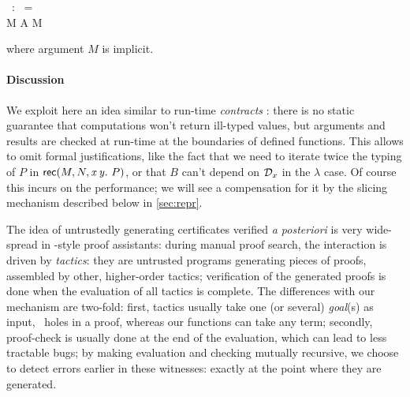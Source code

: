 \documentclass{llncs}
\begin{document}
\begin{mathleft}
  \fget{}\ :\     =
  \\\qquad\quad \lamd M \lamd A \lamd \md M
\end{mathleft}

\noindent
where argument $M$ is implicit.

\paragraph{Discussion}

We exploit here an idea similar to run-time \emph{contracts}
\cite{wadler2009well}: there is no static guarantee that computations
won't return ill-typed values, but arguments and results are checked
at run-time at the boundaries of defined functions. This allows to
omit formal justifications, like the fact that we need to iterate
twice the typing of $P$ in $\text{\textsf{rec}}({M},{N},{\text{\textit{x}}}\,{\text{\textit{y}}}.\ {P})$, or that $B$ can't depend
on $\mathcal D_x$ in the $\lambda$ case. Of course this incurs on the
performance; we will see a compensation for it by the slicing
mechanism described below in \ref{sec:repr}.

The idea of untrustedly generating certificates verified \emph{a
  posteriori} is very wide-spread in -style proof
assistants: during manual proof search, the interaction is driven by
\emph{tactics}: %
they are untrusted programs generating pieces of proofs, assembled by
other, higher-order tactics; verification of the generated proofs is
done when the evaluation of all tactics is complete. The differences
with our mechanism are two-fold: first, tactics usually take one (or
several) \emph{goal}(s) as input, \ie\ holes in a proof, whereas our
functions can take any term; secondly, proof-check is usually done at
the end of the evaluation, which can lead to less tractable bugs; by
making evaluation and checking mutually recursive, we choose to detect
errors earlier in these witnesses: exactly at the point where they are
generated.
\end{document}
